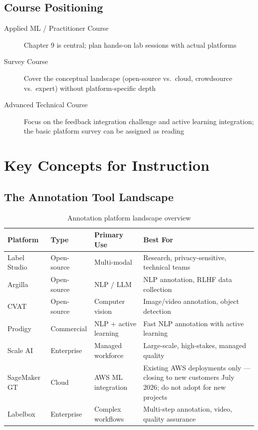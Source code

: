 \subsection{Course Positioning}
\begin{description}
    \item[Applied ML / Practitioner Course] Chapter 9 is central; plan hands-on lab sessions with actual platforms
    \item[Survey Course] Cover the conceptual landscape (open-source vs.\ cloud, crowdsource vs.\ expert) without platform-specific depth
    \item[Advanced Technical Course] Focus on the feedback integration challenge and active learning integration; the basic platform survey can be assigned as reading
\end{description}

\section{Key Concepts for Instruction}

\subsection{The Annotation Tool Landscape}

\begin{table}[htbp]
\caption{Annotation platform landscape overview}
\label{tab:platform-landscape}
\centering
\begin{tabular}{@{}p{2.5cm}p{1.8cm}p{2cm}p{4.5cm}@{}}
\toprule
\textbf{Platform} & \textbf{Type} & \textbf{Primary Use} & \textbf{Best For} \\
\midrule
Label Studio & Open-source & Multi-modal & Research, privacy-sensitive, technical teams \\
Argilla & Open-source & NLP / LLM & NLP annotation, RLHF data collection \\
CVAT & Open-source & Computer vision & Image/video annotation, object detection \\
Prodigy & Commercial & NLP + active learning & Fast NLP annotation with active learning \\
Scale AI & Enterprise & Managed workforce & Large-scale, high-stakes, managed quality \\
SageMaker GT & Cloud & AWS ML integration & Existing AWS deployments only --- closing to new customers July 2026; do not adopt for new projects \\
Labelbox & Enterprise & Complex workflows & Multi-step annotation, video, quality assurance \\
\bottomrule
\end{tabular}
\end{table}

